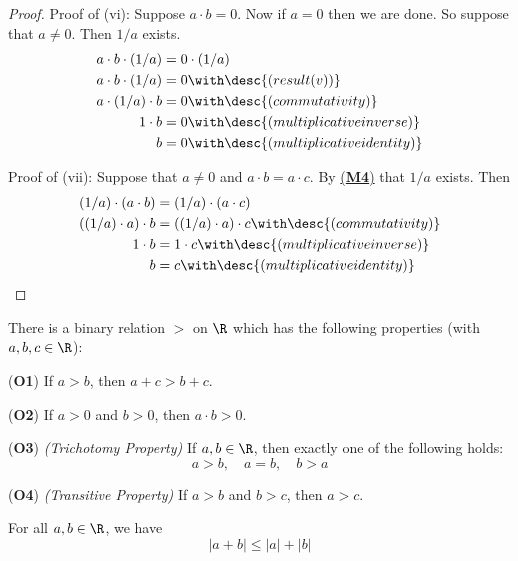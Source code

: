 \begin{proof}
  Proof of (vi): Suppose $a\cdot b=0$. Now if $a=0$ then we are done. So suppose
  that $a\neq0$. Then $1/a$ exists.
  \begin{align*}
    a\cdot b\cdot(1/a) &=0\cdot(1/a)                            \\
    a\cdot b\cdot(1/a) &=0\with\desc{(result (v))}              \\
    a\cdot(1/a)\cdot b &=0\with\desc{(commutativity)}           \\
    1\cdot b           &=0\with\desc{(multiplicative inverse)}  \\
    b                  &=0\with\desc{(multiplicative identity)}
  \end{align*}

  Proof of (vii): Suppose that $a\neq0$ and $a\cdot b=a\cdot c$. By
  \href{bf61f02}{(\textbf{M4})} that $1/a$ exists. Then
  \begin{align*}
    (1/a)\cdot(a\cdot b)  &=(1/a)\cdot(a\cdot c)                             \\
    ((1/a)\cdot a)\cdot b &=((1/a)\cdot a)\cdot c\with\desc{(commutativity)} \\
    1\cdot b              &=1\cdot c\with\desc{(multiplicative inverse)}     \\
    b                     &= c\with\desc{(multiplicative identity)}
  \end{align*}
\end{proof}

\label{d49c63e}

There is a binary relation $>$ on $\R$ which has the following properties (with
$a,b,c\in\R$):

\begin{enumerati}
  \item [(\textbf{O1})] If $a>b$, then $a+c>b+c$.
  \item [(\textbf{O2})] If $a>0$ and $b>0$, then $a\cdot b>0$.
  \item [(\textbf{O3})] \textit{(Trichotomy Property)} If $a,b\in\R$, then
  exactly one of the following holds:
  $$a>b,\quad a=b,\quad b>a$$
  \item [(\textbf{O4})] \textit{(Transitive Property)} If $a>b$ and $b>c$, then
  $a>c$.
\end{enumerati}

\label{f1288ad}

For all $a,b\in\R$, we have
$$
  |a+b|\leq|a|+|b|
$$

